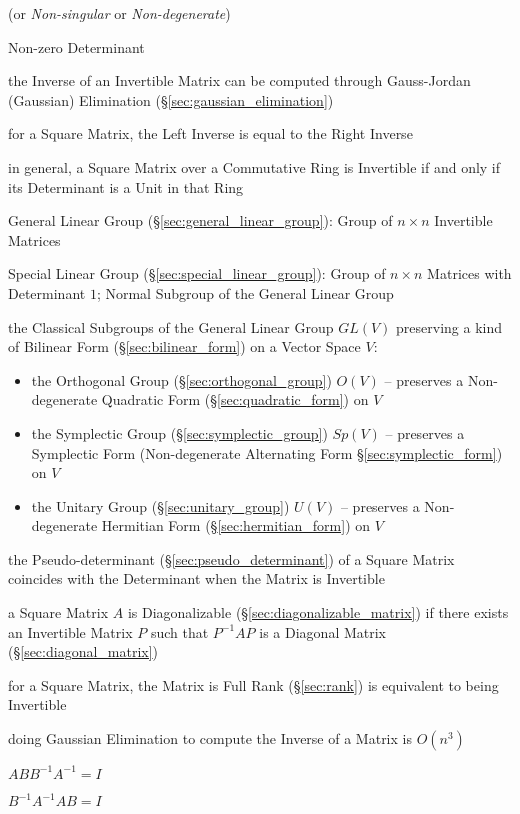 (or \emph{Non-singular} or \emph{Non-degenerate})

Non-zero Determinant

\fist the Inverse of an Invertible Matrix can be computed through Gauss-Jordan
(Gaussian) Elimination (\S\ref{sec:gaussian_elimination})

for a Square Matrix, the Left Inverse is equal to the Right Inverse

in general, a Square Matrix over a Commutative Ring is Invertible if and only
if its Determinant is a Unit in that Ring

\fist General Linear Group (\S\ref{sec:general_linear_group}): Group of $n
\times n$ Invertible Matrices

\fist Special Linear Group (\S\ref{sec:special_linear_group}): Group of $n
\times n$ Matrices with Determinant $1$; Normal Subgroup of the General Linear
Group

the Classical Subgroups of the General Linear Group $GL(V)$ preserving a kind
of Bilinear Form (\S\ref{sec:bilinear_form}) on a Vector Space $V$:
\begin{itemize}
  \item the Orthogonal Group (\S\ref{sec:orthogonal_group}) $O(V)$ -- preserves
    a Non-degenerate Quadratic Form (\S\ref{sec:quadratic_form}) on $V$
  \item the Symplectic Group (\S\ref{sec:symplectic_group}) $Sp(V)$
    -- preserves a Symplectic Form (Non-degenerate Alternating Form
    \S\ref{sec:symplectic_form}) on $V$
  \item the Unitary Group (\S\ref{sec:unitary_group}) $U(V)$
    -- preserves a Non-degenerate Hermitian Form (\S\ref{sec:hermitian_form})
    on $V$
\end{itemize}

the Pseudo-determinant (\S\ref{sec:pseudo_determinant}) of a Square Matrix
coincides with the Determinant when the Matrix is Invertible

a Square Matrix $A$ is Diagonalizable (\S\ref{sec:diagonalizable_matrix}) if
there exists an Invertible Matrix $P$ such that $P^{-1}AP$ is a Diagonal Matrix
(\S\ref{sec:diagonal_matrix})

for a Square Matrix, the Matrix is Full Rank (\S\ref{sec:rank}) is
equivalent to being Invertible

doing Gaussian Elimination to compute the Inverse of a Matrix is $O(n^3)$

$ABB^{-1}A^{-1} = I$

$B^{-1}A^{-1}AB = I$


